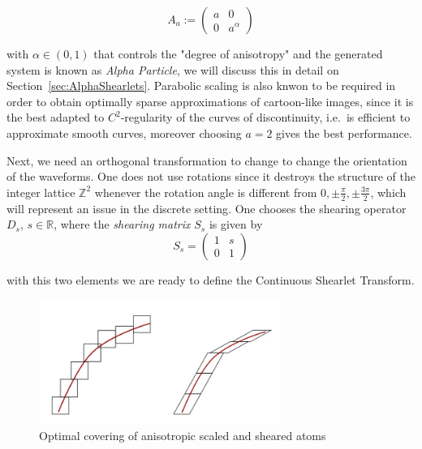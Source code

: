 \begin{equation}
\label{eq:scalingalpha}
A_a:=
\left(
\begin{matrix}
a & 0 \\
0 & a^{\alpha}
\end{matrix}
\right)
\end{equation}

with $\alpha\in (0,1)$ that controls the "degree of anisotropy" and the generated system is known as \textit{Alpha Particle}, we will discuss this in detail on Section~\ref{sec:AlphaShearlets}. Parabolic scaling is also knwon to be required in order to obtain optimally sparse approximations of cartoon-like images, since it is the best adapted to $C^2$-regularity of the curves of discontinuity, i.e.\ is efficient to approximate smooth curves, moreover choosing $a=2$ gives the best performance.

\bigskip

 Next, we need an orthogonal transformation to change to change the orientation of the waveforms. One does not use rotations since it destroys the structure of the integer lattice $\mathbb{Z}^2$ whenever the rotation angle is different from $0,\pm\frac{\pi}{2},\pm\frac{3\pi}{2}$, which will represent an issue in the discrete setting. One chooses the shearing operator $D_s$, $s\in\mathbb{R}$, where the \textit{shearing matrix} $S_s$ is given by 
\begin{equation}
\label{eq:shearing}
S_s=
\left(
\begin{matrix}
1 & s \\
0 & 1
\end{matrix}
\right)
\end{equation}

with this two elements we are ready to define the Continuous Shearlet Transform.

\begin{figure}[h!]
\centering
\includegraphics[width = 0.7\textwidth]{./Diagrams/anisotropic_isotropic.jpg}
\caption{Optimal covering of anisotropic scaled and sheared atoms}
\label{edges-images}
\end{figure}

